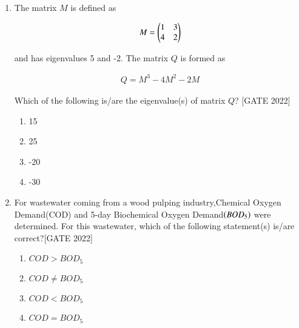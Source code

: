 \documentclass[journal,12pt,onecolumn]{IEEEtran}
\theoremstyle{remark}
\begin{document}
\begin{enumerate}
\item The matrix   $M$  is defined as

\begin{align*}
M = \begin{pmatrix}1 & 3 \\ 4 & 2 \end{pmatrix}
\end{align*}

and has eigenvalues 5 and -2. The matrix  $ Q  $ is formed as

\begin{align*}
Q = M^3 - 4M^2 - 2M
\end{align*}

Which of the following is/are the eigenvalue(s) of matrix  $ Q  $?
\hfill{[GATE 2022]}
\begin{multicols}{4}
\begin{enumerate}
    \item 15
    \item 25
    \item -20
    \item -30
\end{enumerate}
\end{multicols}

\item For wastewater coming from a wood pulping industry,Chemical Oxygen Demand(COD) and 5-day Biochemical Oxygen Demand$\left(BO D_{5}\right)$ were determined. For this wastewater, which of the following statement(s) is/are correct?\hfill{[GATE 2022]}
\begin{multicols}{4}
\begin{enumerate}
\item $COD > BO D_{5}$
\item $COD \neq BO D_{5}$
\item $COD < BO D_{5}$ 
\item $COD = BO D_{5}$
\end{enumerate}
\end{multicols}

\end{enumerate}
\end{document}
